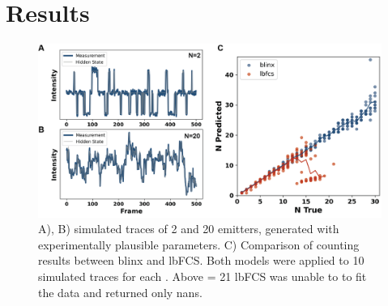 \section{Results}

\begin{figure}[ht]
  \includegraphics[width=\linewidth]{figures/comparison_lbfcs}
  \caption{A), B) simulated traces of 2 and 20 emitters, generated with experimentally plausible parameters. C) Comparison of counting results between blinx and lbFCS. Both models were applied to 10 simulated traces for each \n. Above \n = 21 lbFCS was unable to to fit the data and returned only nans. }
  \label{fig:results:comparison}
\end{figure}


